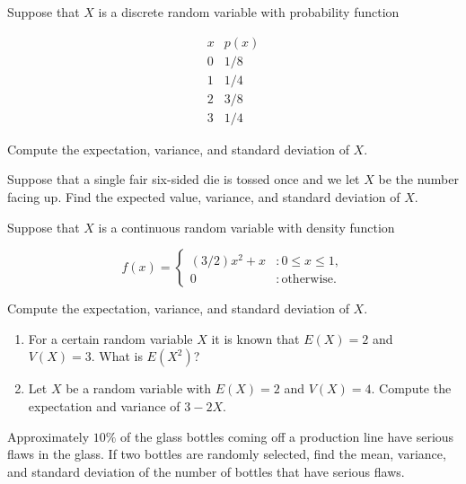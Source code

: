 \documentclass[12pt,reqno]{amsart}
\begin{document}
\newpage
\prob Suppose that $X$ is a discrete random variable with probability function

	\[
	\begin{array}{c|c}
	x & p(x) \\ \hline
	0 & 1/8   \\
	1 & 1/4   \\
	2 & 3/8  \\
	3 & 1/4 
	\end{array}
	\]

Compute the expectation, variance, and standard deviation of $X$.\vfill





















\bigskip
\prob Suppose that a single fair six-sided die is tossed once and we let $X$ be the number facing up. Find the expected value, variance, and standard deviation of $X$.\vfill





















\bigskip
\prob Suppose that $X$ is a continuous random variable with density function
	
	\[
	f(x) = \begin{cases}
	(3/2)x^2 + x & : 0\leq x \leq 1, \\
	0 & : \text{otherwise}.
	\end{cases}
	\]

Compute the expectation, variance, and standard deviation of $X$.\vfill














\newpage
\prob

\begin{enumerate}
\item For a certain random variable $X$ it is known that $E(X)=2$ and $V(X) = 3$. What is $E(X^2)$?\vfill
\item Let $X$ be a random variable with $E(X)=2$ and $V(X)=4$. Compute the expectation and variance of $3-2X$.\vfill
\end{enumerate}















\bigskip
\prob Approximately $10\%$ of the glass bottles coming off a production line have serious flaws in the glass. If two bottles are randomly selected, find the mean, variance, and standard deviation of the number of bottles that have serious flaws.\vfill
\end{document}
